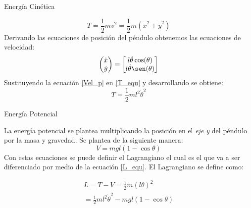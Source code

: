 \begin{flushleft}
{\large Energía Cinética}
\end{flushleft}
\begin{equation} \label{T_equ}
T = \frac{1}{2}mv^2 = \frac{1}{2}m(\dot{x}^2 + \dot{y}^2) 
\end{equation}
Derivando las ecuaciones de posición del péndulo obtenemos las ecuaciones de velocidad:
\begin{equation} \label{Vel_p}
\left(\begin{matrix}
\dot{x}\\
\dot{y}
\end{matrix}\right) = 
\begin{bmatrix}
l\dot{\theta}\cos(\theta)\\
l\dot{\theta}\sen(\theta)
\end{bmatrix}
\end{equation}
Sustituyendo la ecuación \ref{Vel_p} en \ref{T_equ} y desarrollando se obtiene:
\begin{equation}
T = \frac{1}{2}ml^2\dot{\theta}^2
\end{equation}
\begin{flushleft}
{\large Energía Potencial}
\end{flushleft}
La energía potencial se plantea multiplicando la posición en el \emph{eje y} del péndulo por la masa y gravedad. Se plantea de la siguiente manera:
\begin{equation} \label{V_equ}
V = mgl(1-\cos \theta)
\end{equation}
Con estas ecuaciones se puede definir el Lagrangiano el cual es el que va a ser diferenciado por medio de la ecuación \ref{L_equ}. El Lagrangiano se define como:

\begin{large}
\begin{align*}
L = T - V = \frac{1}{2}m(l\theta)^2 \\
= \frac{1}{2}ml^2\dot{\theta}^2 - mgl(1-\cos \theta)
\end{align*}
\end{large}

